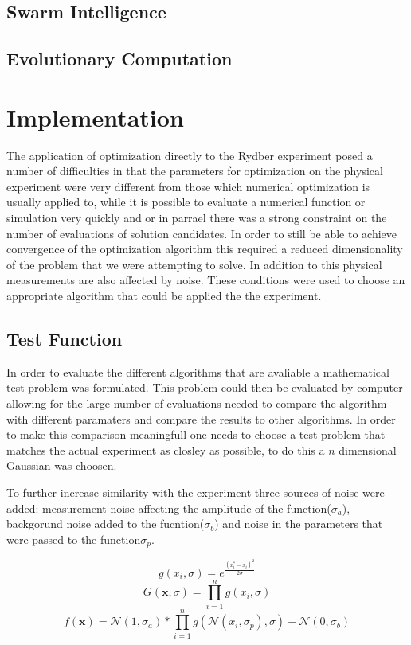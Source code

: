 \documentclass[a4paper,titlepage]{report}
\begin{document}
\section{Swarm Intelligence}

\section{Evolutionary Computation}

\chapter{Implementation}

The application of optimization directly to the Rydber experiment posed a number of difficulties in that the parameters for optimization on the physical experiment were very different from those which numerical optimization is usually applied to, while it is possible to evaluate a numerical function or simulation very quickly and or in parrael there was a strong constraint on the number of evaluations of solution candidates. In order to still be able to achieve convergence of the optimization algorithm this required a reduced dimensionality of the problem that we were attempting to solve. In addition to this physical measurements are also affected by noise. These conditions were used to choose an appropriate algorithm that could be applied the the experiment.

\section{Test Function}
In order to evaluate the different algorithms that are avaliable a mathematical test problem was formulated. This problem could then be evaluated by computer allowing for the large number of evaluations needed to compare the algorithm with different paramaters and compare the results to other algorithms. In order to make this comparison meaningfull one needs to choose a test problem that matches the actual experiment as closley as possible, to do this a $n$ dimensional Gaussian was choosen.

To further increase similarity with the experiment three sources of noise were added: measurement noise affecting the amplitude of the function($\sigma_a$), backgorund noise added to the fucntion($\sigma_b$) and noise in the parameters that were passed to the function$\sigma_p$. 

\[g(x_i,\sigma) = e^{\frac{(x_i^*-x_i)^2}{2\sigma}}\]
\[G(\mathbf{x},\sigma) = \prod_{i=1}^n g(x_i, \sigma)\]
\[f(\mathbf{x}) =  \mathcal{N}(1,\sigma_a) * \prod_{i=1}^n g(\mathcal{N}(x_i,\sigma_p), \sigma) + \mathcal{N}(0,\sigma_b) \]
\end{document}
